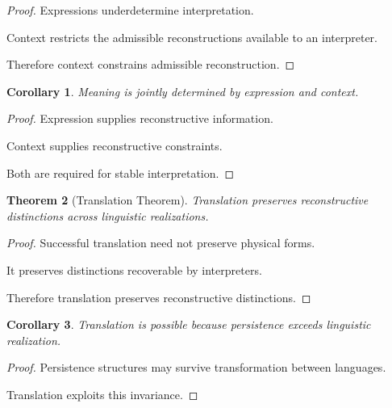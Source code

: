 \documentclass[12pt,oneside]{article}
\newtheorem{theorem}{Theorem}[section] \newtheorem{lemma}[theorem]{Lemma} \newtheorem{proposition}[theorem]{Proposition} \newtheorem{corollary}[theorem]{Corollary}
\theoremstyle{definition}
\begin{document}
\begin{proof}

Expressions underdetermine interpretation.

Context restricts the admissible reconstructions available to an interpreter.

Therefore context constrains admissible reconstruction.

\end{proof}

\begin{corollary}

Meaning is jointly determined by expression and context.

\end{corollary}

\begin{proof}

Expression supplies reconstructive information.

Context supplies reconstructive constraints.

Both are required for stable interpretation.

\end{proof}

\begin{theorem}[Translation Theorem]

Translation preserves reconstructive distinctions across linguistic realizations.

\end{theorem}

\begin{proof}

Successful translation need not preserve physical forms.

It preserves distinctions recoverable by interpreters.

Therefore translation preserves reconstructive distinctions.

\end{proof}

\begin{corollary}

Translation is possible because persistence exceeds linguistic realization.

\end{corollary}

\begin{proof}

Persistence structures may survive transformation between languages.

Translation exploits this invariance.

\end{proof}
\end{document}
